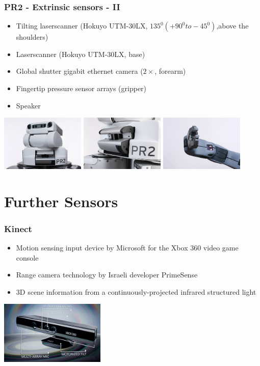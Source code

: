 \begin{frame}
  \frametitle{PR2 - Extrinsic sensors - II}
\begin{itemize}
    \item Tilting laserscanner (Hokuyo UTM-30LX, $135^0 (+90^0 to -45^0)$,above the shoulders)
    \item Laserscanner (Hokuyo UTM-30LX, base)
    \item Global shutter gigabit ethernet camera ($2\times$, forearm)
    \item Fingertip pressure sensor arrays (gripper)
    \item Speaker
\end{itemize}
\hspace{-4ex}
\includegraphics[width=4cm]{img/head_tiltLRF.jpg} 
\includegraphics[width=4cm]{img/tilted_lrf.jpg}
\includegraphics[width=4cm]{img/pr2_hand_camera.jpg}  
\end{frame}

\section{Further Sensors}

\begin{frame} 
 \frametitle{Kinect}
\begin{itemize}
 \item Motion sensing input device by Microsoft for the Xbox 360 video game console
 \item Range camera technology by Israeli developer PrimeSense
 \item 3D scene information from a continuously-projected infrared structured light
\end{itemize}
\hspace{35ex}\includegraphics[width=5cm]{img/kinect.png}
\end{frame}

